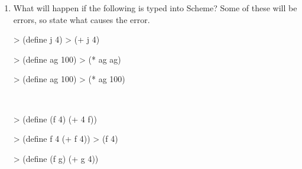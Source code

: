 \documentclass[pdftex,11pt]{article}
\begin{document}
\begin{enumerate}
\item What will happen if the following is typed into Scheme?  Some of
  these will be errors, so state what causes the error.
\vspace{.02in}
\renewcommand{\theenumii}{\Alph{enumii}}
\renewcommand{\labelenumii}{\theenumii}

\begin{minipage}{0.32\textwidth}
\begin{answer}
> (define j 4)
> (+ j 4)

\underline{                    }
\end{answer}
\end{minipage}
\hspace{.02in}
\begin{minipage}{0.32\textwidth}
\begin{answer}
> (define ag 100)
> (* ag ag)

\underline{                    }
\end{answer}
\end{minipage}
\hspace{.02in}
\begin{minipage}{0.32\textwidth}
\begin{answer}
> (define ag 100)
> (* ag 100)

\underline{                    }
\end{answer}
\end{minipage}\\

\begin{minipage}{0.32\textwidth}
\begin{answer}
> (define (f 4)
    (+ 4 f))

\underline{                    }
\end{answer}
\end{minipage}
\hspace{.02in}
\begin{minipage}{0.32\textwidth}
\begin{answer}
> (define f 4 (+ f 4))
> (f 4)

\underline{                    }
\end{answer}
\end{minipage}
\hspace{.02in}
\begin{minipage}{0.32\textwidth}
\begin{answer}
> (define (f g)
    (+ g 4))

\underline{                    }
\end{answer}
\end{minipage}


\end{enumerate}
\end{document}
